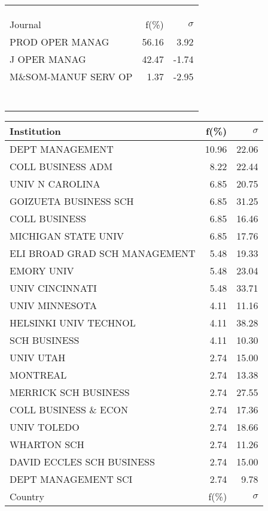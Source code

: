 \documentclass[a4paper,11pt]{report}
\begin{document}
\begin{landscape}
\begin{table}[!ht]
{\begin{tabular}{|l r r|}
 &  & \\
 &  & \\
 &  & \\
\hline
\hline
Journal & f(\%) & $\sigma$\\
\hline
PROD OPER MANAG & 56.16 & 3.92\\
J OPER MANAG & 42.47 & -1.74\\
M\&SOM-MANUF SERV OP & 1.37 & -2.95\\
 &  & \\
 &  & \\
 &  & \\
 &  & \\
 &  & \\
 &  & \\
 &  & \\
\hline
\end{tabular}
}
{\scriptsize\begin{tabular}{|l r r|}
\hline
Institution & f(\%) & $\sigma$\\
\hline
DEPT MANAGEMENT & 10.96 & 22.06\\
COLL BUSINESS ADM & 8.22 & 22.44\\
UNIV N CAROLINA & 6.85 & 20.75\\
GOIZUETA BUSINESS SCH & 6.85 & 31.25\\
COLL BUSINESS & 6.85 & 16.46\\
MICHIGAN STATE UNIV & 6.85 & 17.76\\
ELI BROAD GRAD SCH MANAGEMENT & 5.48 & 19.33\\
EMORY UNIV & 5.48 & 23.04\\
UNIV CINCINNATI & 5.48 & 33.71\\
UNIV MINNESOTA & 4.11 & 11.16\\
HELSINKI UNIV TECHNOL & 4.11 & 38.28\\
SCH BUSINESS & 4.11 & 10.30\\
UNIV UTAH & 2.74 & 15.00\\
MONTREAL & 2.74 & 13.38\\
MERRICK SCH BUSINESS & 2.74 & 27.55\\
COLL BUSINESS \& ECON & 2.74 & 17.36\\
UNIV TOLEDO & 2.74 & 18.66\\
WHARTON SCH & 2.74 & 11.26\\
DAVID ECCLES SCH BUSINESS & 2.74 & 15.00\\
DEPT MANAGEMENT SCI & 2.74 & 9.78\\
\hline
\hline
Country & f(\%) & $\sigma$\\
\hline

\end{tabular}}
\end{table}
\end{landscape}
\end{document}
